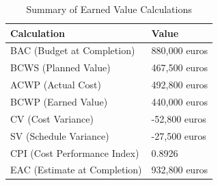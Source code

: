 \documentclass[12pt]{article} %
\begin{document}
\begin{table}[h!]
    \centering
    \begin{tabular}{|l|l|}
        \hline
        \textbf{Calculation} & \textbf{Value} \\ 
        \hline
        BAC (Budget at Completion) & 880,000 euros \\ 
        \hline
        BCWS (Planned Value) & 467,500 euros \\ 
        \hline
        ACWP (Actual Cost) & 492,800 euros \\ 
        \hline
        BCWP (Earned Value) & 440,000 euros \\ 
        \hline
        CV (Cost Variance) & -52,800 euros \\ 
        \hline
        SV (Schedule Variance) & -27,500 euros \\ 
        \hline
        CPI (Cost Performance Index) & 0.8926 \\ 
        \hline
        EAC (Estimate at Completion) & 932,800 euros \\ 
        \hline
    \end{tabular}
    \caption{Summary of Earned Value Calculations}
\end{table}
\end{document}
